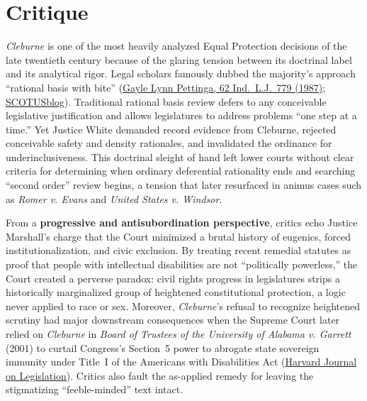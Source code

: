 \documentclass[12pt]{article}
\begin{document}
\section{Critique}

\textit{Cleburne} is one of the most heavily analyzed Equal Protection decisions of the late twentieth century because of the glaring tension between its doctrinal label and its analytical rigor. Legal scholars famously dubbed the majority's approach ``rational basis with bite'' (\href{https://www.repository.law.indiana.edu/cgi/viewcontent.cgi?article=2074&context=ilj}{Gayle Lynn Pettinga, 62 Ind.\ L.J.\ 779 (1987)}; \href{https://www.scotusblog.com/2011/08/why-the-court-can-strike-down-marriage-restrictions-under-rational-basis-review/}{SCOTUSblog}). Traditional rational basis review defers to any conceivable legislative justification and allows legislatures to address problems ``one step at a time.'' Yet Justice White demanded record evidence from Cleburne, rejected conceivable safety and density rationales, and invalidated the ordinance for underinclusiveness. This doctrinal sleight of hand left lower courts without clear criteria for determining when ordinary deferential rationality ends and searching ``second order'' review begins, a tension that later resurfaced in animus cases such as \textit{Romer v. Evans} and \textit{United States v. Windsor}.

From a \textbf{progressive and antisubordination perspective}, critics echo Justice Marshall's charge that the Court minimized a brutal history of eugenics, forced institutionalization, and civic exclusion. By treating recent remedial statutes as proof that people with intellectual disabilities are not ``politically powerless,'' the Court created a perverse paradox: civil rights progress in legislatures strips a historically marginalized group of heightened constitutional protection, a logic never applied to race or sex. Moreover, \textit{Cleburne}'s refusal to recognize heightened scrutiny had major downstream consequences when the Supreme Court later relied on \textit{Cleburne} in \textit{Board of Trustees of the University of Alabama v. Garrett} (2001) to curtail Congress's Section~5 power to abrogate state sovereign immunity under Title~I of the Americans with Disabilities Act (\href{https://journals.law.harvard.edu/jol/2025/02/22/our-rhizomatic-constitution/}{Harvard Journal on Legislation}). Critics also fault the as-applied remedy for leaving the stigmatizing ``feeble-minded'' text intact.
\end{document}
